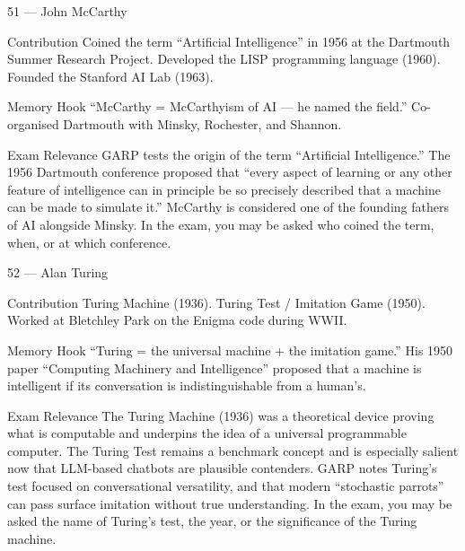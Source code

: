 \documentclass[aspectratio=169,8pt]{beamer}
\begin{document}
	\begin{frame}{51 --- John McCarthy}
		\begin{block}{Contribution}
			Coined the term ``Artificial Intelligence'' in 1956 at the Dartmouth Summer Research Project. Developed the LISP programming language (1960). Founded the Stanford AI Lab (1963).
		\end{block}
		\begin{block}{Memory Hook}
			``McCarthy = McCarthyism of AI --- he named the field.'' Co-organised Dartmouth with Minsky, Rochester, and Shannon.
		\end{block}
		\begin{block}{Exam Relevance}
			GARP tests the origin of the term ``Artificial Intelligence.'' The 1956 Dartmouth conference proposed that ``every aspect of learning or any other feature of intelligence can in principle be so precisely described that a machine can be made to simulate it.'' McCarthy is considered one of the founding fathers of AI alongside Minsky. In the exam, you may be asked who coined the term, when, or at which conference.
		\end{block}
	\end{frame}
	
	\begin{frame}{52 --- Alan Turing}
		\begin{block}{Contribution}
			Turing Machine (1936). Turing Test / Imitation Game (1950). Worked at Bletchley Park on the Enigma code during WWII.
		\end{block}
		\begin{block}{Memory Hook}
			``Turing = the universal machine + the imitation game.'' His 1950 paper ``Computing Machinery and Intelligence'' proposed that a machine is intelligent if its conversation is indistinguishable from a human's.
		\end{block}
		\begin{block}{Exam Relevance}
			The Turing Machine (1936) was a theoretical device proving what is computable and underpins the idea of a universal programmable computer. The Turing Test remains a benchmark concept and is especially salient now that LLM-based chatbots are plausible contenders. GARP notes Turing's test focused on conversational versatility, and that modern ``stochastic parrots'' can pass surface imitation without true understanding. In the exam, you may be asked the name of Turing's test, the year, or the significance of the Turing machine.
		\end{block}
	\end{frame}
	
\end{document}
